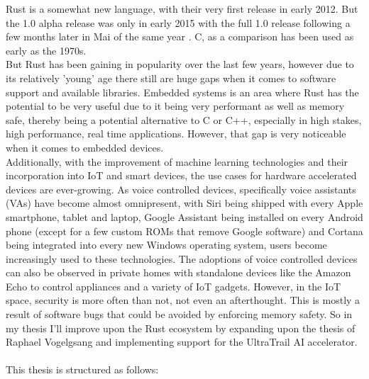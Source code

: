 

Rust \cite{rustlang} is a somewhat new language, with their very first release in early 2012.
But the 1.0 alpha release was only in early 2015 with the full 1.0 release following a few
months later in Mai of the same year \cite{rust_releases}.
C, as a comparison has been used as early as the 1970s.\\
But Rust has been gaining in popularity \cite{rust_popularity} over the last few years, however
due to its relatively 'young' age there still are huge gaps when it comes to software support and available libraries.
Embedded systems is an area where Rust has the potential to be very useful due to it being very performant as well as memory safe,
thereby being a potential alternative to C or C++, especially in high stakes, high performance, real time applications.
However, that gap is very noticeable when it comes to embedded devices.\\
Additionally, with the improvement of machine learning technologies and their incorporation into IoT and smart devices,
the use cases for hardware accelerated devices are ever-growing.
As voice controlled devices, specifically voice assistants (VAs) have become almost omnipresent,
with Siri being shipped with every Apple smartphone, tablet and laptop, Google Assistant being installed
on every Android phone (except for a few custom ROMs that remove Google software) and Cortana being integrated
into every new Windows operating system, users become increasingly used to these technologies.
The adoptions of voice controlled devices can also be observed in private homes with standalone
devices like the Amazon Echo to control appliances and a variety of IoT gadgets.
However, in the IoT space, security is more often than not, not even an afterthought.
This is mostly a result of software bugs that could be avoided by enforcing memory safety.
So in my thesis I'll improve upon the Rust ecosystem by expanding upon the thesis of Raphael Vogelgsang \cite{rust_pulp}
and implementing support for the UltraTrail \cite{ultratrail} AI accelerator.
\\\\
This thesis is structured as follows:
